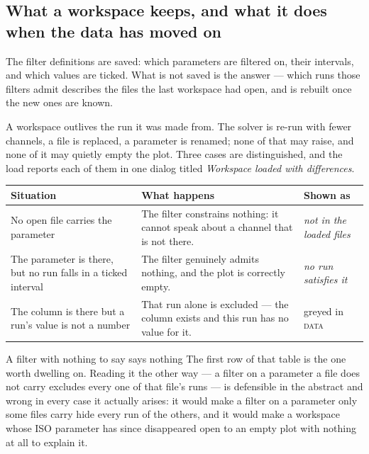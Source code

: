 \documentclass[11pt,a4paper,oneside]{report}
\newcommand{\tab}[1]{\textsc{#1}}
\begin{document}
\subsection{What a workspace keeps, and what it does when the data has moved on}

The filter definitions are saved: which parameters are filtered on, their
intervals, and which values are ticked. What is not saved is the answer --- which
runs those filters admit describes the files the last workspace had open, and is
rebuilt once the new ones are known.

A workspace outlives the run it was made from. The solver is re-run with fewer
channels, a file is replaced, a parameter is renamed; none of that may raise, and
none of it may quietly empty the plot. Three cases are distinguished, and the
load reports each of them in one dialog titled \emph{Workspace loaded with
differences}.

\begin{center}
\small
\begin{tabular}{@{}p{}p{}p{}@{}}
\toprule
\textbf{Situation} & \textbf{What happens} & \textbf{Shown as} \\
\midrule
No open file carries the parameter & The filter constrains nothing: it cannot speak about a channel that is not there. & \emph{not in the loaded files} \\
\addlinespace
The parameter is there, but no run falls in a ticked interval & The filter genuinely admits nothing, and the plot is correctly empty. & \emph{no run satisfies it} \\
\addlinespace
The column is there but a run's value is not a number & That run alone is excluded --- the column exists and this run has no value for it. & greyed in \tab{data} \\
\bottomrule
\end{tabular}
\end{center}

\begin{aoenote}{A filter with nothing to say says nothing}
The first row of that table is the one worth dwelling on. Reading it the other
way --- a filter on a parameter a file does not carry excludes every one of that
file's runs --- is defensible in the abstract and wrong in every case it
actually arises: it would make a filter on a parameter only some files carry
hide every run of the others, and it would make a workspace whose ISO parameter
has since disappeared open to an empty plot with nothing at all to explain it.
\end{aoenote}
\end{document}
